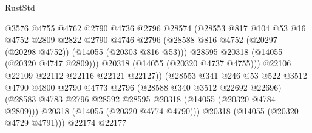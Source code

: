 \begin{lexlean}{RustStd}
\begin{coremodule}
                                    @3576
                                    @4755
                                    @4762
                                    @2790
                                    @4736
                                    @2796
                                    @28574
                                    (@28553
                                      @817
                                      @104
                                      @53
                                      @16
                                      @4752
                                      @2809
                                      @2822
                                      @2790
                                      @4746
                                      @2796
                                      (@28588
                                        @816
                                        @4752
                                        (@20297 (@20298 @4752))
                                        (@14055 (@20303 @816 @53)))
                                      @28595
                                      @20318
                                      (@14055 (@20320 @4747 @2809)))
                                    @20318
                                    (@14055 (@20320 @4737 @4755)))
                                  @22106
                                  @22109
                                  @22112
                                  @22116
                                  @22121
                                  @22127))
                              (@28553
                                @341
                                @246
                                @53
                                @522
                                @3512
                                @4790
                                @4800
                                @2790
                                @4773
                                @2796
                                (@28588 @340 @3512 @22692 @22696)
                                (@28583
                                  @4783
                                  @2796
                                  @28592
                                  @28595
                                  @20318
                                  (@14055 (@20320 @4784 @2809)))
                                @20318
                                (@14055 (@20320 @4774 @4790)))
                              @20318
                              (@14055 (@20320 @4729 @4791)))
                            @22174
                            @22177

\end{coremodule}
\end{lexlean}
